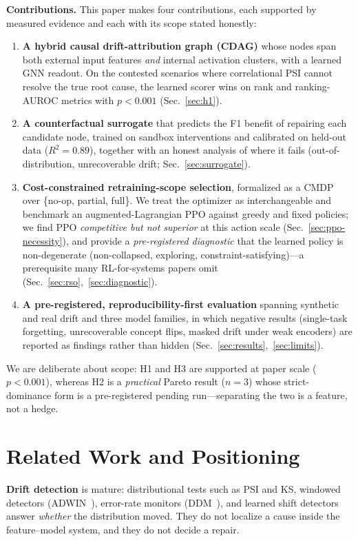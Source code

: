 \documentclass[conference]{IEEEtran}
\begin{document}
\textbf{Contributions.} This paper makes four contributions, each
supported by measured evidence and each with its scope stated honestly:
\begin{enumerate}
\item \textbf{A hybrid causal drift-attribution graph (CDAG)} whose nodes
span both external input features \emph{and} internal activation clusters,
with a learned GNN readout. On the contested scenarios where correlational
PSI cannot resolve the true root cause, the learned scorer wins on rank
and ranking-AUROC metrics with $p<0.001$ (Sec.~\ref{sec:h1}).
\item \textbf{A counterfactual surrogate} that predicts the F1 benefit of
repairing each candidate node, trained on sandbox interventions and
calibrated on held-out data ($R^2=0.89$), together with an honest analysis
of where it fails (out-of-distribution, unrecoverable drift; Sec.~\ref{sec:surrogate}).
\item \textbf{Cost-constrained retraining-scope selection}, formalized as a
CMDP over \{no-op, partial, full\}. We treat the optimizer as
interchangeable and benchmark an augmented-Lagrangian PPO against greedy and
fixed policies; we find PPO \emph{competitive but not superior} at this
action scale (Sec.~\ref{sec:ppo-necessity}), and provide a
\emph{pre-registered diagnostic} that the learned policy is non-degenerate
(non-collapsed, exploring, constraint-satisfying)---a prerequisite many
RL-for-systems papers omit (Sec.~\ref{sec:rso},~\ref{sec:diagnostic}).
\item \textbf{A pre-registered, reproducibility-first evaluation}
spanning synthetic and real drift and three model families, in which
negative results (single-task forgetting, unrecoverable concept flips,
masked drift under weak encoders) are reported as findings rather than
hidden (Sec.~\ref{sec:results},~\ref{sec:limits}).
\end{enumerate}

We are deliberate about scope: H1 and H3 are supported at paper scale
($p<0.001$), whereas H2 is a \emph{practical} Pareto result ($n{=}3$) whose
strict-dominance form is a pre-registered pending run---separating the two
is a feature, not a hedge.

\section{Related Work and Positioning}\label{sec:related}
\textbf{Drift detection} is mature: distributional tests such as PSI and
KS, windowed detectors (ADWIN~\cite{bifet2007adwin}), error-rate monitors
(DDM~\cite{gama2004ddm}), and learned shift detectors~\cite{rabanser2019failing}
answer \emph{whether} the distribution moved. They do not localize a cause
inside the feature--model system, and they do not decide a repair.
\end{document}
